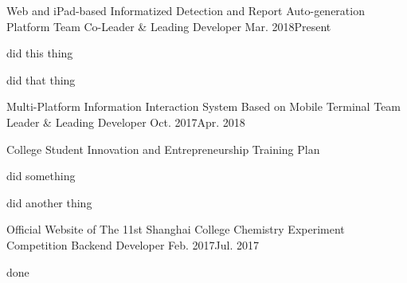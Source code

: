 
\begin{projitem}
    {Web and iPad-based Informatized Detection and Report Auto-generation Platform}
    {Team Co-Leader \& Leading Developer}
    {Mar. 2018}{Present}
    \item did this thing
    \item did that thing
\end{projitem}

\begin{projitem}
    {Multi-Platform Information Interaction System Based on Mobile Terminal}
    {Team Leader \& Leading Developer}
    {Oct. 2017}{Apr. 2018}
    \item College Student Innovation and Entrepreneurship Training Plan
    \item did something
    \item did another thing
\end{projitem}

\begin{projitem}
    {Official Website of The 11st Shanghai College Chemistry Experiment Competition}
    {Backend Developer}
    {Feb. 2017}{Jul. 2017}
    \item done
\end{projitem}

\endinput